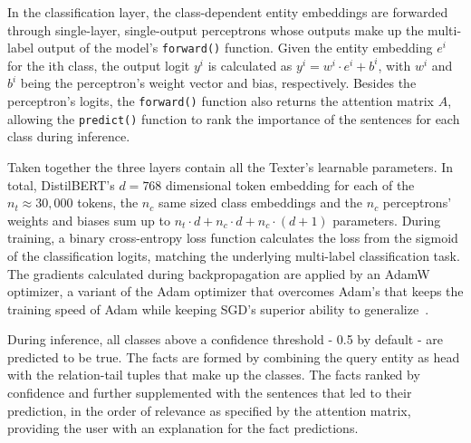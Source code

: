 In the classification layer, the class-dependent entity embeddings are forwarded through single-layer, single-output perceptrons whose outputs make up the multi-label output of the model's \lstinline{forward()} function. Given the entity embedding $e^i$ for the ith class, the output logit $y^i$ is calculated as $y^i = w^i \cdot e^i + b^i$, with $w^i$ and $b^i$ being the perceptron's weight vector and bias, respectively. Besides the perceptron's logits, the \lstinline{forward()} function also returns the attention matrix $A$, allowing the \lstinline{predict()} function to rank the importance of the sentences for each class during inference.

Taken together the three layers contain all the Texter's learnable parameters. In total, DistilBERT's $d = 768$ dimensional token embedding for each of the $n_t \approx 30,000$ tokens, the $n_c$ same sized class embeddings and the $n_c$ perceptrons' weights and biases sum up to $n_t \cdot d + n_c \cdot d + n_c \cdot (d + 1)$ parameters. During training, a binary cross-entropy loss function calculates the loss from the sigmoid of the classification logits, matching the underlying multi-label classification task. The gradients calculated during backpropagation are applied by an AdamW optimizer, a variant of the Adam optimizer that overcomes Adam's that keeps the training speed of Adam while keeping SGD's superior ability to generalize~\cite{Loshchilov2019DecoupledWD}.

During inference, all classes above a confidence threshold - 0.5 by default - are predicted to be true. The facts are formed by combining the query entity as head with the relation-tail tuples that make up the classes. The facts ranked by confidence and further supplemented with the sentences that led to their prediction, in the order of relevance as specified by the attention matrix, providing the user with an explanation for the fact predictions.
